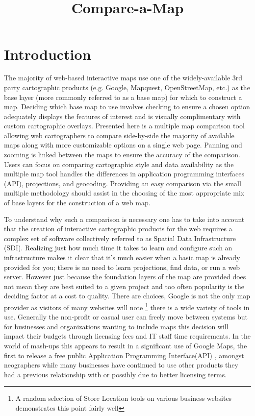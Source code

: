 \documentclass[12pt,letterpaper]{article}
\title{Compare-a-Map}
\begin{document}
\section{Introduction}
The majority of web-based interactive maps use one of the widely-available 3rd party cartographic products (e.g. Google, Mapquest, OpenStreetMap, etc.) as the base layer (more commonly referred to as a base map) for which to construct a map. Deciding which base map to use involves checking to ensure a chosen option adequately displays the features of interest and is visually complimentary with custom cartographic overlays.  Presented here is a multiple map comparison tool allowing web cartographers to compare side-by-side the majority of available maps along with more customizable options on a single web page. Panning and zooming is linked between the maps to ensure the accuracy of the comparison. Users can focus on comparing cartographic style and data availability as the multiple map tool handles the differences in application programming interfaces (API), projections, and geocoding.  Providing an easy comparison via the small multiple methodology should assist in the choosing \parencite{Tufte1990} of the most appropriate mix of base layers for the construction of a web map.

	To understand why such a comparison is necessary one has to take into account that the creation of interactive cartographic products for the web requires a complex set of software collectively referred to as Spatial Data Infrastructure (SDI). Realizing just how much time it takes to learn and configure such an infrastructure makes it clear that it's much easier when a basic map is already provided for you; there is no need to learn projections, find data, or run a web server. However just because the foundation layers of the map are provided does not mean they are best suited to a given project and too often popularity is the deciding factor at a cost to quality. There are choices, Google is not the only map provider as visitors of many websites will note \footnote{A random selection of Store Location tools on various business websites demonstrates this point fairly well} there is a wide variety of tools in use. Generally the non-profit or casual user can freely move between systems but for businesses and organizations wanting to include maps this decision will impact their budgets through  licensing fees and IT staff time requirements. In the world of mash-ups this appears to result in a significant use of Google Maps, the first to release a free public Application Programming Interface(API) \parencite{Turner2006}, amongst neographers while many businesses have continued to use other products they had a previous relationship with or possibly due to better licensing terms.
	  
\end{document}
